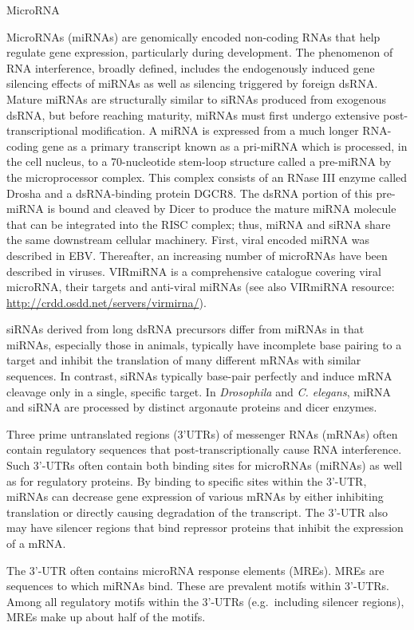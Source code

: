 MicroRNA

MicroRNAs (miRNAs) are genomically encoded non-coding RNAs that help regulate gene expression, particularly during development. The phenomenon of RNA interference, broadly defined, includes the endogenously induced gene silencing effects of miRNAs as well as silencing triggered by foreign dsRNA. Mature miRNAs are structurally similar to siRNAs produced from exogenous dsRNA, but before reaching maturity, miRNAs must first undergo extensive post-transcriptional modification. A miRNA is expressed from a much longer RNA-coding gene as a primary transcript known as a pri-miRNA which is processed, in the cell nucleus, to a 70-nucleotide stem-loop structure called a pre-miRNA by the microprocessor complex. This complex consists of an RNase III enzyme called Drosha and a dsRNA-binding protein DGCR8. The dsRNA portion of this pre-miRNA is bound and cleaved by Dicer to produce the mature miRNA molecule that can be integrated into the RISC complex; thus, miRNA and siRNA share the same downstream cellular machinery. First, viral encoded miRNA was described in EBV. Thereafter, an increasing number of microRNAs have been described in viruses. VIRmiRNA is a comprehensive catalogue covering viral microRNA, their targets and anti-viral miRNAs (see also VIRmiRNA resource: \url{http://crdd.osdd.net/servers/virmirna/}).

siRNAs derived from long dsRNA precursors differ from miRNAs in that miRNAs, especially those in animals, typically have incomplete base pairing to a target and inhibit the translation of many different mRNAs with similar sequences. In contrast, siRNAs typically base-pair perfectly and induce mRNA cleavage only in a single, specific target. In \emph{Drosophila} and \emph{C. elegans}, miRNA and siRNA are processed by distinct argonaute proteins and dicer enzymes.

Three prime untranslated regions (3'UTRs) of messenger RNAs (mRNAs) often contain regulatory sequences that post-transcriptionally cause RNA interference. Such 3'-UTRs often contain both binding sites for microRNAs (miRNAs) as well as for regulatory proteins. By binding to specific sites within the 3'-UTR, miRNAs can decrease gene expression of various mRNAs by either inhibiting translation or directly causing degradation of the transcript. The 3'-UTR also may have silencer regions that bind repressor proteins that inhibit the expression of a mRNA.

The 3'-UTR often contains microRNA response elements (MREs). MREs are sequences to which miRNAs bind. These are prevalent motifs within 3'-UTRs. Among all regulatory motifs within the 3'-UTRs (e.g.~including silencer regions), MREs make up about half of the motifs.

